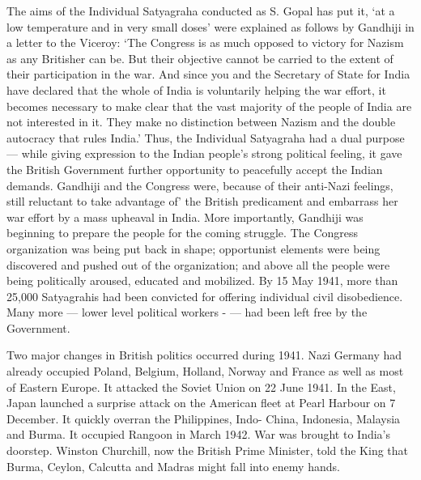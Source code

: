 \begin{multicols}{2}
The aims of the Individual Satyagraha conducted as S. Gopal has put it, `at a low temperature and in very small doses' were explained as follows by Gandhiji in a letter to the Viceroy: `The Congress is as much opposed to victory for Nazism as any Britisher can be. But their objective cannot be carried to the extent of their participation in the war. And since you and the Secretary of State for India have declared that the whole of India is voluntarily helping the war effort, it becomes necessary to make clear that the vast majority of the people of India are not interested in it. They make no distinction between Nazism and the double autocracy that rules India.' Thus, the Individual Satyagraha had a dual purpose --- while giving expression to the Indian people's strong political feeling, it gave the British Government further opportunity to peacefully accept the Indian demands. Gandhiji and the Congress were, because of their anti-Nazi feelings, still reluctant to take advantage of' the British predicament and embarrass her war effort by a mass upheaval in India. More importantly, Gandhiji was beginning to prepare the people for the coming struggle. The Congress organization was being put back in shape; opportunist elements were being discovered and pushed out of the organization; and above all the people were being politically aroused, educated and mobilized. By 15 May 1941, more than 25,000 Satyagrahis had been convicted for offering individual civil disobedience. Many more --- lower level political workers - --- had been left free by the Government. 

Two major changes in British politics occurred during 1941. Nazi Germany had already occupied Poland, Belgium, Holland, Norway and France as well as most of Eastern Europe. It attacked the Soviet Union on 22 June 1941. In the East, Japan launched a surprise attack on the American fleet at Pearl Harbour on 7 December. It quickly overran the Philippines, Indo- China, Indonesia, Malaysia and Burma. It occupied Rangoon in March 1942. War was brought to India's doorstep. Winston Churchill, now the British Prime Minister, told the King that Burma, Ceylon, Calcutta and Madras might fall into enemy hands. 


\end{multicols}
